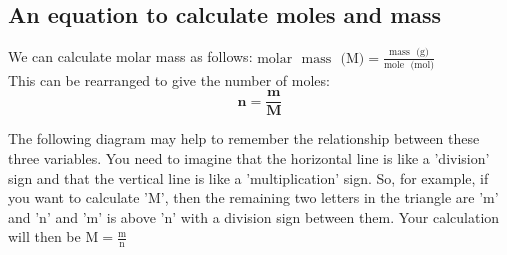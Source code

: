             \subsection*{An equation to calculate moles and mass}
            \nopagebreak
      \label{m38717*id277432}We can calculate molar mass as follows:
$\text{molar ~mass ~(M)} = \frac{\text{mass ~(g)}}{\text{mole ~(mol)}}$ \\
This can be rearranged to give the number of moles:
      \label{m38717*id277436}\nopagebreak\noindent{}
    \begin{equation*}
    \mathbf{n} = \frac{\mathbf{m}}{\mathbf{M}}
      \end{equation*}
\label{m38717*notfhsst!!!underscore!!!id374}
	\par
      \label{m38717*id277605}The following diagram may help to remember the relationship between these three variables. You need to imagine that the horizontal line is like a 'division' sign and that the vertical line is like a 'multiplication' sign. So, for example, if you want to calculate 'M', then the remaining two letters in the triangle are 'm' and 'n' and 'm' is above 'n' with a division sign between them. Your calculation will then be $\text{M}=\frac{\text{m}}{\text{n}}$\par 
      \label{m38717*id277613}
    \setcounter{subfigure}{0}
	\begin{figure}[H] %
\begin{center}
\end{center}
 \end{figure}       
      \par 
\label{m38717*secfhsst!!!underscore!!!id409}
      \noindent
